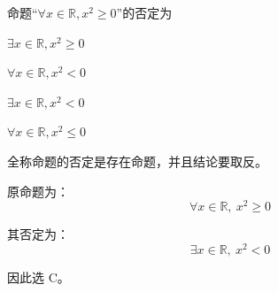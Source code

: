 \begin{question}
命题“$\forall x \in \mathbb{R}, x^{2} \geq 0$”的否定为 \paren[C]
\begin{choices}
  \item $\exists x \in \mathbb{R}, x^{2} \geq 0$
  \item $\forall x \in \mathbb{R}, x^{2}<0$
  \item $\exists x \in \mathbb{R}, x^{2}<0$
  \item $\forall x \in \mathbb{R}, x^{2} \leq 0$
\end{choices}
\begin{solution}
全称命题的否定是存在命题，并且结论要取反。

原命题为：
\[
\forall x \in \mathbb{R},\ x^2 \ge 0
\]

其否定为：
\[
\exists x \in \mathbb{R},\ x^2 < 0
\]

因此选 C。
\end{solution}
\end{question}

